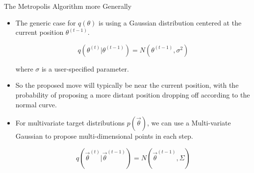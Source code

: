\documentclass[handout]{beamer}
\begin{document}
\begin{frame}{The Metropolis Algorithm more Generally}
\scriptsize{

\begin{itemize}





\item The generic case for $q(\theta)$ is using a Gaussian distribution centered at the current position $\theta^{(t-1)}$.

\begin{displaymath}
 q(\theta^{(t)}|\theta^{(t-1)})=N(\theta^{(t-1)},\sigma^2)
\end{displaymath}

where $\sigma$ is a user-specified parameter.

\item So the proposed move will typically be near the current position, with the probability of proposing a more distant position dropping off according to the normal curve.

\item For multivariate target distributions $p(\vec{\theta})$, we can use a Multi-variate Gaussian to propose multi-dimensional points in each step.



\begin{displaymath}
 q(\vec{\theta}^{(t)}|\vec{\theta}^{(t-1)})=N(\vec{\theta}^{(t-1)},\Sigma)
\end{displaymath}

\end{itemize}



}
\end{frame}
\end{document}
